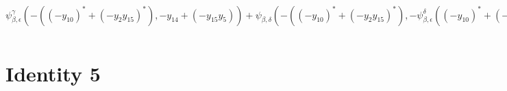 \documentclass[a4paper,landscape]{article}
\begin{document}
\addvspace{0.5cm}
$ \psi_{\beta,\epsilon}^\gamma(-((-y_{10})^*+(-y_2y_{15})^*),-y_{14}+(-y_{15}y_5))+\psi_{\beta,\delta}(-((-y_{10})^*+(-y_2y_{15})^*),-\psi_{\beta,\epsilon}^\delta((-y_{10})^*+(-y_2y_{15})^*,-y_{14}+(-y_{15}y_5)))+\psi_{\beta,\delta}(-((-y_{10})^*+(-y_2y_{15})^*)+\psi_{\alpha,\epsilon}^\beta(y_1,-y_{14}+(-y_{15}y_5)),\psi_{\alpha,\epsilon}^\delta(y_1,-y_{14}+(-y_{15}y_5))+\psi_{\gamma,\epsilon}(-\psi_{\beta,\epsilon}^\delta((-y_6)^*+(-y_4y_{10})^*,y_{15})+\psi_{\alpha,\epsilon}^\delta(y_3,y_{15})+\psi_{\gamma,\epsilon}(-\psi_{\beta,\epsilon}^\delta((y_7)^*,y_{10})+\psi_{\alpha,\epsilon}^\delta(y_5,y_{10})+\psi_{\gamma,\epsilon}(-y_8,y_{10})+(-(y_9)^*),y_{15})+(-(y_{12})^*),-y_{14}+(-y_{15}y_5))+(-(-((-\psi_{\alpha,\delta}^\beta(y_{15},-(y_7)^*+\psi_{\alpha,\epsilon}^\beta(y_5,y_{10})+\psi_{\alpha,\gamma}(y_5,\psi_{\alpha,\delta}^\gamma(y_5,\psi_{\alpha,\epsilon}^\delta(y_5,y_{10})+\psi_{\gamma,\epsilon}(-y_8,y_{10})+(-(y_9)^*))+\psi_{\alpha,\epsilon}^\gamma(y_5,y_{10})+(-y_8))+\psi_{\alpha,\delta}^\beta(y_5,\psi_{\alpha,\epsilon}^\delta(y_5,y_{10})+\psi_{\gamma,\epsilon}(-y_8,y_{10})+(-(y_9)^*))))^*+(-\psi_{\alpha,\epsilon}^\beta(y_{15},y_4))^*+(-\psi_{\alpha,\gamma}(y_{15},-y_{11}+(-y_5y_{12})))^*+(-y_{13})^*))^*))+\psi_{\alpha,\delta}^\gamma(y_1,\psi_{\alpha,\epsilon}^\delta(y_1,-y_{14}+(-y_{15}y_5))+\psi_{\gamma,\epsilon}(-\psi_{\beta,\epsilon}^\delta((-y_6)^*+(-y_4y_{10})^*,y_{15})+\psi_{\alpha,\epsilon}^\delta(y_3,y_{15})+\psi_{\gamma,\epsilon}(-\psi_{\beta,\epsilon}^\delta((y_7)^*,y_{10})+\psi_{\alpha,\epsilon}^\delta(y_5,y_{10})+\psi_{\gamma,\epsilon}(-y_8,y_{10})+(-(y_9)^*),y_{15})+(-(y_{12})^*),-y_{14}+(-y_{15}y_5))+(-(-((-\psi_{\alpha,\delta}^\beta(y_{15},-(y_7)^*+\psi_{\alpha,\epsilon}^\beta(y_5,y_{10})+\psi_{\alpha,\gamma}(y_5,\psi_{\alpha,\delta}^\gamma(y_5,\psi_{\alpha,\epsilon}^\delta(y_5,y_{10})+\psi_{\gamma,\epsilon}(-y_8,y_{10})+(-(y_9)^*))+\psi_{\alpha,\epsilon}^\gamma(y_5,y_{10})+(-y_8))+\psi_{\alpha,\delta}^\beta(y_5,\psi_{\alpha,\epsilon}^\delta(y_5,y_{10})+\psi_{\gamma,\epsilon}(-y_8,y_{10})+(-(y_9)^*))))^*+(-\psi_{\alpha,\epsilon}^\beta(y_{15},y_4))^*+(-\psi_{\alpha,\gamma}(y_{15},-y_{11}+(-y_5y_{12})))^*+(-y_{13})^*))^*))+\psi_{\alpha,\epsilon}^\gamma(y_1,-y_{14}+(-y_{15}y_5))+(-\psi_{\beta,\epsilon}^\delta((-y_6)^*+(-y_4y_{10})^*,y_{15})+\psi_{\alpha,\epsilon}^\delta(y_3,y_{15})+\psi_{\gamma,\epsilon}(-\psi_{\beta,\epsilon}^\delta((y_7)^*,y_{10})+\psi_{\alpha,\epsilon}^\delta(y_5,y_{10})+\psi_{\gamma,\epsilon}(-y_8,y_{10})+(-(y_9)^*),y_{15})+(-(y_{12})^*)) $

\section*{Identity 5}
\end{document}
